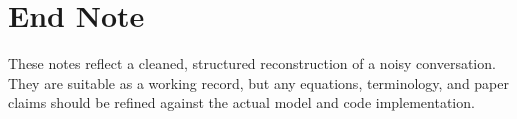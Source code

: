 \documentclass[11pt]{article}
\begin{document}
\section*{End Note}
These notes reflect a cleaned, structured reconstruction of a noisy conversation. They are suitable as a working record, but any equations, terminology, and paper claims should be refined against the actual model and code implementation.
\end{document}

